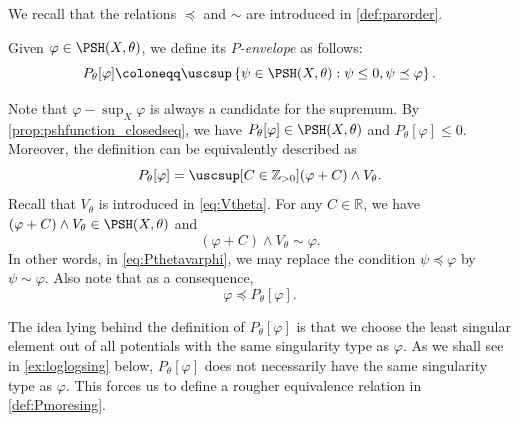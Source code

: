 We recall that the relations $\preceq$ and $\sim$ are introduced in \cref{def:parorder}.
\begin{definition}\label{def:Penv}
    Given $\varphi\in \PSH(X,\theta)$, we define its \emph{$P$-envelope} as follows:
    \begin{equation}\label{eq:Pthetavarphi}
    P_{\theta}[\varphi]\coloneqq \uscsup \left\{ \psi\in \PSH(X,\theta): \psi\leq 0,\psi\preceq \varphi \right\}.
    \end{equation}
\end{definition}
Note that $\varphi-\sup_X \varphi$ is always a candidate for the supremum. By \cref{prop:pshfunction_closedseq}, we have $P_{\theta}[\varphi]\in \PSH(X,\theta)$ and $P_{\theta}[\varphi]\leq 0$.
Moreover, the definition can be equivalently described as
\begin{equation}\label{eq:Penvsups}
    P_{\theta}[\varphi]=\uscsup[C\in \mathbb{Z}_{>0}](\varphi+C)\land V_{\theta}.
\end{equation}
Recall that $V_{\theta}$ is introduced in \eqref{eq:Vtheta}. For any $C\in \mathbb{R}$, we have $(\varphi+C)\land V_{\theta}\in \PSH(X,\theta)$ and
\[
(\varphi+C)\land V_{\theta}\sim \varphi.
\]
In other words, in \eqref{eq:Pthetavarphi}, we may replace the condition $\psi\preceq \varphi$ by $\psi\sim \varphi$. Also note that as a consequence,
\begin{equation}\label{eq:varphipreceqP}
    \varphi\preceq P_{\theta}[\varphi].
\end{equation}



The idea lying behind the definition of $P_{\theta}[\varphi]$ is that we choose the least singular element out of all potentials with the same singularity type as $\varphi$. As we shall see in \cref{ex:loglogsing} below, $P_{\theta}[\varphi]$ does not necessarily have the same singularity type as $\varphi$. This forces us to define a rougher equivalence relation in \cref{def:Pmoresing}.

